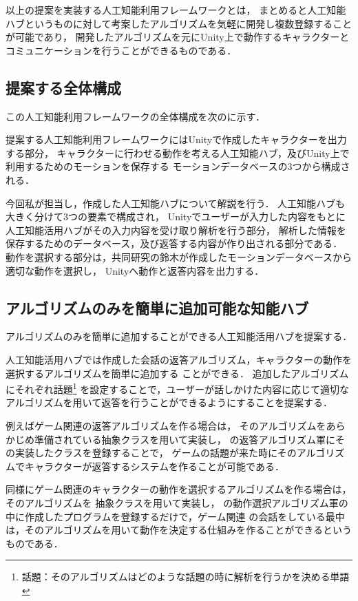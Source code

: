 以上の提案を実装する人工知能利用フレームワークとは，
まとめると人工知能ハブというものに対して考案したアルゴリズムを気軽に開発し複数登録することが可能であり，
開発したアルゴリズムを元にUnity上で動作するキャラクターとコミュニケーションを行うことができるものである．
\subsection{提案する全体構成}\label{sec:allAr}
この人工知能利用フレームワークの全体構成を次のに示す．


提案する人工知能利用フレームワークにはUnityで作成したキャラクターを出力する部分，
キャラクターに行わせる動作を考える人工知能ハブ，及びUnity上で利用するためのモーションを保存する
モーションデータベースの3つから構成される．

今回私が担当し，作成した人工知能ハブについて解説を行う．
人工知能ハブも大きく分けて3つの要素で構成され，
Unityでユーザーが入力した内容をもとに人工知能活用ハブがその入力内容を受け取り解析を行う部分，
解析した情報を保存するためのデータベース，及び返答する内容が作り出される部分である．
動作を選択する部分は，共同研究の鈴木が作成したモーションデータベースから適切な動作を選択し，
Unityへ動作と返答内容を出力する．

\subsection{アルゴリズムのみを簡単に追加可能な知能ハブ}
アルゴリズムのみを簡単に追加することができる人工知能活用ハブを提案する．

人工知能活用ハブでは作成した会話の返答アルゴリズム，キャラクターの動作を選択するアルゴリズムを簡単に追加する
ことができる．
追加したアルゴリズムにそれぞれ話題\footnote{話題：そのアルゴリズムはどのような話題の時に解析を行うかを決める単語}
を設定することで，ユーザーが話しかけた内容に応じて適切なアルゴリズムを用いて返答を行うことができるようにすることを提案する．

例えばゲーム関連の返答アルゴリズムを作る場合は，
そのアルゴリズムをあらかじめ準備されている抽象クラスを用いて実装し，
の返答アルゴリズム軍にその実装したクラスを登録することで，
ゲームの話題が来た時にそのアルゴリズムでキャラクターが返答するシステムを作ることが可能である．

同様にゲーム関連のキャラクターの動作を選択するアルゴリズムを作る場合は，そのアルゴリズムを
抽象クラスを用いて実装し，
の動作選択アルゴリズム軍の中に作成したプログラムを登録するだけで，ゲーム関連
の会話をしている最中は，そのアルゴリズムを用いて動作を決定する仕組みを作ることができるというものである．

